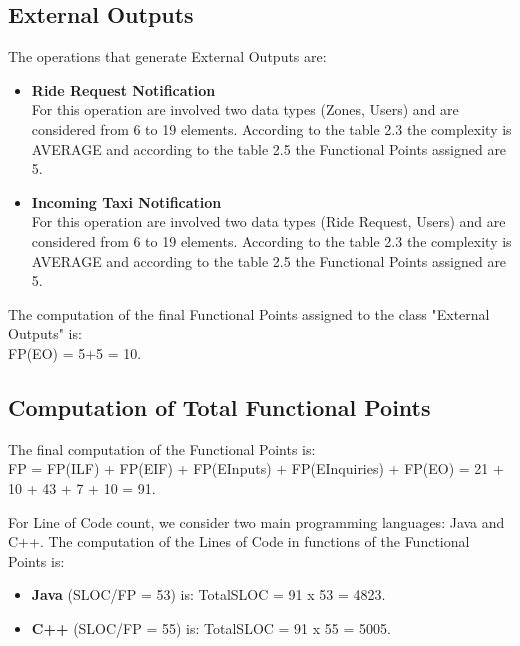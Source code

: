 \documentclass[../../../../projectPlan.tex]{subfiles}
\begin{document}
		\subsection{External Outputs}
		    The operations that generate External Outputs are:
		    \begin{itemize}
		    	\item \textbf{Ride Request Notification} \\
		    	      For this operation are involved two data types (Zones, Users) and are considered from 6 to 19 elements. According to the table 2.3 the complexity is AVERAGE and according to the table 2.5 the Functional Points assigned are 5.

		    	\item \textbf{Incoming Taxi Notification} \\
		              For this operation are involved two data types (Ride Request, Users) and are considered from 6 to 19 elements. According to the table 2.3 the complexity is AVERAGE and according to the table 2.5 the Functional Points assigned are 5.
		    \end{itemize}

		    The computation of the final Functional Points assigned to the class "External Outputs" is:\\
			FP(EO) = 5+5 = 10.

		\subsection{Computation of Total Functional Points}

			The final computation of the Functional Points is: \\
			FP = FP(ILF) + FP(EIF) + FP(EInputs) + FP(EInquiries) + FP(EO) = 21 + 10 + 43 + 7 + 10 = 91.


			For Line of Code count, we consider two main programming languages: Java and C++.
			The computation of the Lines of Code in functions of the Functional Points is:
			\begin{itemize}
				\item \textbf{Java} (SLOC/FP = 53) is: TotalSLOC = 91 x 53 = 4823.
				\item \textbf{C++} (SLOC/FP = 55) is: TotalSLOC = 91 x 55 = 5005.
			\end{itemize} 
\end{document}
